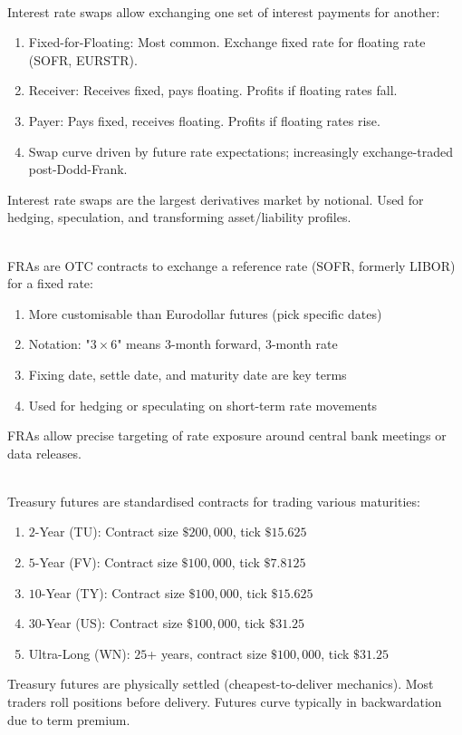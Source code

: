 \begin{remark} \\
Interest rate swaps allow exchanging one set of interest payments for another:
\begin{enumerate}[label=\roman*.]
\setlength{\itemsep}{0pt}
\item Fixed-for-Floating: Most common. Exchange fixed rate for floating rate (SOFR, EURSTR).
\item Receiver: Receives fixed, pays floating. Profits if floating rates fall.
\item Payer: Pays fixed, receives floating. Profits if floating rates rise.
\item Swap curve driven by future rate expectations; increasingly exchange-traded post-Dodd-Frank.
\end{enumerate}
Interest rate swaps are the largest derivatives market by notional. Used for hedging, speculation, and transforming asset/liability profiles.
\end{remark}

\begin{remark} \\
FRAs are OTC contracts to exchange a reference rate (SOFR, formerly LIBOR) for a fixed rate:
\begin{enumerate}[label=\roman*.]
\setlength{\itemsep}{0pt}
\item More customisable than Eurodollar futures (pick specific dates)
\item Notation: "$3 \times 6$" means $3$-month forward, $3$-month rate
\item Fixing date, settle date, and maturity date are key terms
\item Used for hedging or speculating on short-term rate movements
\end{enumerate}
FRAs allow precise targeting of rate exposure around central bank meetings or data releases.
\end{remark}

\begin{remark} \\
Treasury futures are standardised contracts for trading various maturities:
\begin{enumerate}[label=\roman*.]
\setlength{\itemsep}{0pt}
\item $2$-Year (TU): Contract size $\$200,000$, tick $\$15.625$
\item $5$-Year (FV): Contract size $\$100,000$, tick $\$7.8125$
\item $10$-Year (TY): Contract size $\$100,000$, tick $\$15.625$
\item $30$-Year (US): Contract size $\$100,000$, tick $\$31.25$
\item Ultra-Long (WN): $25$+ years, contract size $\$100,000$, tick $\$31.25$
\end{enumerate}
Treasury futures are physically settled (cheapest-to-deliver mechanics). Most traders roll positions before delivery. Futures curve typically in backwardation due to term premium.
\end{remark}

